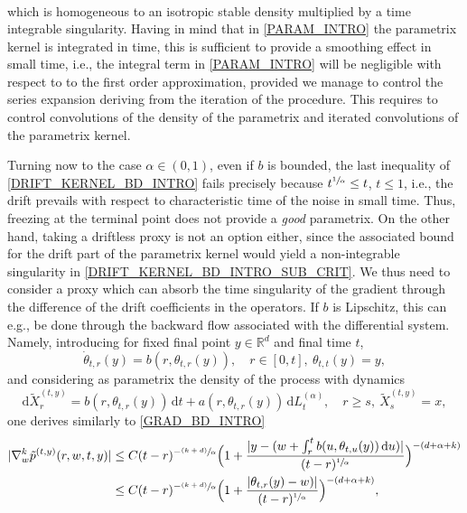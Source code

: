 \documentclass[11pt]{article}
\newcommand{\ie}{i.e.,\xspace}
\newcommand{\eg}{e.g.,\xspace}
\numberwithin{equation}{section}\providecommand{\asymp}{\mathrel{\sim}}
\newcommand{\psfrac}[2]{\sfrac{(#1)}{#2}}
\newcommand{\rd}{\mathrm{d}}
\theoremstyle{plain}
\theoremstyle{definition}
\newcommand\mR{\mathbb{R}}
\newcommand\1{{\mathbf{1}}}
\newcommand{\dif}{\,\mathrm{d}}
\begin{document}
{\begin{equation}
\begin{aligned}
\end{aligned}
\end{equation}
which is homogeneous to an isotropic stable density multiplied by a time integrable singularity.
Having in mind that in \eqref{PARAM_INTRO} the parametrix kernel is integrated in time,
this is sufficient to provide a smoothing effect in small time, \ie the integral term in \eqref{PARAM_INTRO} will be negligible with respect to to the first order approximation, provided we manage to control the series expansion deriving from the iteration of the procedure. This requires to control convolutions of the density of the parametrix and iterated convolutions of the parametrix kernel.}

{Turning now to the case $\alpha\in (0,1) $, even if $b$ is bounded, the last inequality of \eqref{DRIFT_KERNEL_BD_INTRO} fails precisely because $t^{\sfrac 1\alpha} \le t$, $t\le 1 $, \ie the drift prevails with respect to characteristic time of the noise in small time. Thus, freezing at the terminal point does not provide a \textit{good} parametrix. On the other hand, taking a driftless proxy is not an option either, since the associated bound for the drift part of the parametrix kernel would yield a non-integrable singularity in \eqref{DRIFT_KERNEL_BD_INTRO_SUB_CRIT}. We thus need to consider a proxy which can absorb the time singularity of the gradient through the difference of the drift coefficients in the operators. If $b$ is Lipschitz, this can \eg be done through the backward flow associated with the differential system. Namely,
introducing for fixed final point $y\in \mR^d$ and final time $t$,
\begin{equation}\label{DIFF_DYN}
\dot \theta_{t,r}(y)=b(r,\theta_{t,r}(y)),\quad r\in [0,t],\ \theta_{t,t}(y)=y,
\end{equation}
and considering as parametrix the density of the process with dynamics
\begin{equation}\label{PROXY_2}
\rd \tilde X_r^{(t,y)}=b(r,\theta_{t,r}(y))\dif t+a(r,\theta_{t,r}(y))\dif L^{(\alpha)}_t,\quad r\ge s,\ \tilde X_s^{(t,y)}=x,
\end{equation}
one derives similarly to \eqref{GRAD_BD_INTRO}
\begin{align*}%
|\nabla_w^k \tilde p^{(t,y)}(r,w,t,y)|&\le C (t-r)^{-\psfrac{k+d}\alpha}\Bigl(1+\frac{|y-(w+\int_r^t b(u,\theta_{t,u}(y))\dif u)|}{(t-r)^{\sfrac 1\alpha}}\Bigr)^{-(d+\alpha+k)}\\
&\le  C (t-r)^{-\psfrac{k+d}\alpha}\Bigl(1+\frac{|\theta_{t,r}(y)-w)|}{(t-r)^{\sfrac 1\alpha}}\Bigr)^{-(d+\alpha+k)},

\end{align*}}
\end{document}

